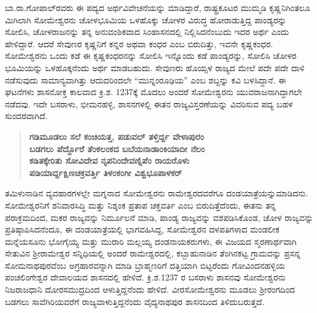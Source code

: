 ಬಾ.ರಾ.ಗೋಪಾಲ್​ರವರು ಈ ಪದ್ಯದ ಅರ್ಥವಿವೇಚನೆಯನ್ನು ಮಾಡಿದ್ದಾರೆ, ರಾಷ್ಟ್ರಕೂಟರ ಮುಮ್ಮಡಿ ಕೃಷ್ಣನಿ\-ಗಿಂತಲೂ ಮಿಗಿಲಾಗಿ ಸೋಮೇಶ್ವರನು ಚೋಳಭೂಮಿಯ ಒಳಹೊಕ್ಕು ಚೋಳರ ವಿರುದ್ಧ ಹೋರಾಡುತ್ತಿದ್ದ ಪಾಂಡ್ಯರನ್ನು ಸೋಲಿಸಿ, ಚೋಳರಾಜನನ್ನು ತನ್ನ ಅನುವಂಶಿಕವಾದ ಸಿಂಹಾಸನದಲ್ಲಿ ನಿಲ್ಲಿಸಿದನೆಂಬುದು ಇದರ ಅರ್ಥ ಎಂದು ಹೇಳಿದ್ದಾರೆ. ಆದರೆ ಸೇವುಣರ ಕೃಷ್ಣನಿಗೆ ಕನ್ನರ ಅಥವಾ ಕಂಧರ ಎಂಬ ಬಿರುದಿತ್ತು, ಇವನೇ ಕೃಷ್ಣಕಂಧರ. ಸೋಮೇಶ್ವರನು ಒಂದು ಕಡೆ ಈ ಕೃಷ್ಣಕಂಧರನನ್ನು ಸೋಲಿಸಿ ಇನ್ನೊಂದು ಕಡೆ ಪಾಂಡ್ಯರನ್ನು, ಸೋಲಿಸಿ ಚೋಳರ ಭೂಮಿಯನ್ನು ಒಳಹೊಕ್ಕನೆಂದು ಅರ್ಥ ಮಾಡಬಹುದು. ಸೇವುಣರು ಹೊಯ್ಸಳ ರಾಜ್ಯದ ಮೇಲೆ ಪದೇ ಪದೇ ದಾಳಿ ನಡೆಸುವುದು ಸಾಮಾನ್ಯವಾಗಿತ್ತು ಆದುದರಿಂದಲೇ “ಮುನ್ನಂರೂಢಿಯ” ಎಂಬ ಶಬ್ದನ್ನು ಕವಿ ಬಳಸಿದ್ದಾನೆ. ಈ ಘಟನೆಗಳು ಶಾಸನೋಕ್ತ ಕಾಲವಾದ ಕ್ರಿ.ಶ. 1237ಕ್ಕೆ ಮೊದಲು ಅಂದರೆ ಸೋಮೇಶ್ವರನು ಯುವರಾಜನಾಗಿದ್ದಾಗಲೇ ನಡೆದವು. ಇದೇ ಬಸರಾಳು, ಭೀಮನಹಳ್ಳಿ, ಶಾಸನಗಳಲ್ಲಿ ಈತನ ರಾಜ್ಯವಿಸ್ತರಣೆಯನ್ನು ವಿವರಿಸುವ ಪದ್ಯ ಬಹಳ ಸುಂದರವಾಗಿದೆ.

\begin{verse}
\textbf{ಗಡಿಮೂಡಲು ಸಲೆ ಕಂಚಿಯತ್ತ, ಪಡುವಲ್​ ತಳ್ತಿರ್ದ್ದ ವೇಳಾಪುರಂ} \\\textbf{ಬಡಗಲು ಪೆರ್ದ್ದೊರೆ ತೆಂಕಲಂಕದ ಬಬೆಯನಾಡಾಂಕಿಯಾದೀ ನೆಲಂ} \\\textbf{ಕಡಿತಕ್ಕೇರಿತು ಸೋವಿದೇವ ನೃಪನಿಂದೇವಣ್ನಿಪೆಂ ರಾಯರೊಳು} \\\textbf{ಪಡಿಯಾರ್ದ್ದಕ್ಷಿಣಚಕ್ರವರ್ತ್ತಿ ತಿಳಂಕಂಗೀ ವಿಶ್ವಭೂಪಾಳಕರ್​}
\end{verse}

ತಮಿಳುನಾಡಿನ ವ್ಯವಹಾರಗಳಲ್ಲೇ ಮಗ್ನನಾದ ಸೋಮೇಶ್ವರನು ರಾಮೇಶ್ವರದವರೆಗೂ ದಂಡಯಾತ್ರೆಯನ್ನು\break ಮಾಡಿದನು. ಸೋಮೇಶ್ವರನಿಗೆ ಶನಿವಾರಸಿದ್ಧಿ ಮತ್ತು ನಿಶ್ಶಂಕ ಪ್ರತಾಪ ಚಕ್ತವರ್ತಿ ಎಂಬ ಬಿರುದಿತ್ತೆದೆಂದು, ಈತನು ತನ್ನ ಪರಾಕ್ರಮದಿಂದ, ಮಕರ ರಾಜ್ಯವನ್ನು ನಿರ್ಮೂಲನೆ ಮಾಡಿ, ಪಾಂಡ್ಯ ರಾಜ್ಯವನ್ನು ವಶಪಡಿಸಿಕೊಂಡ, ಚೋಳ ರಾಜ್ಯವನ್ನು ಪ್ರತಿಷ್ಠಾಪಿಸಿದನೆಂದೂ, ಈ ದಂಡಯಾತ್ರೆಯಲ್ಲಿ ಭಾಗವಹಿಸಿದ್ದ, ಸೋಮೇಶ್ವರನ ದಳಪತಿಗಳಾದ ಮಂಡಲೀಕ ಮನ್ನೆಯಸೂನು ಭೋಗೈಯ್ಯ ಮತ್ತು ಮುರಾರಿ ಮಲ್ಲಯ್ಯ ದಂಡನಾಯಕರುಗಳು, ಈ ವಿಜಯದ ಸ್ಮರಣಾರ್ಥವಾಗಿ ಸೇತುವಿನ ಶ‍್ರೀರಾಮೇಶ್ವರ ಸನ್ನಿಧಿಯಲ್ಲಿ ಅಂದರೆ ರಾಮೇಶ್ವರದಲ್ಲಿ, ಕಬ್ಬಾಹುನಾಡಿನ ತೆಂಗಿನಕಟ್ಟ ಗ್ರಾಮವನ್ನು ಪ್ರಸನ್ನ ಸೋಮನಾಥಪುರವೆಂಬ ಅಗ್ರಹಾರವನ್ನಾಗಿ ಮಾಡಿ ಬ್ರಾಹ್ಮಣರಿಗೆ ದತ್ತಿಯಾಗಿ ಬಿಟ್ಟರೆಂದು ಗೋವಿಂದನಹಳ್ಳಿಯ ಪಂಚಲಿಂಗೇಶ್ವರ ದೇವಾಲಯದ ಶಾಸನದಲ್ಲಿ ಹೇಳಿದೆ. ಕ್ರಿ.ಶ.1237 ರ ಬಸರಾಳು ಶಾಸನವು ಸೋಮೇಶ್ವರನು ನಿಜರಾಜಧಾನಿ ದೋರಸಮುದ್ರ\-ದಿಂದ ಆಳುತ್ತಿದ್ದನೆಂದು ಹೇಳಿದೆ. ವೀರಸೋಮೇಶ್ವರನು ಮೂಡಲು ಶ‍್ರೀರಂಗದಿಂದ ಬಡಗಲು ಸಾವೆಗಿರಿಯವರೆಗೆ ರಾಜ್ಯವಾಳುತ್ತಿದ್ದನೆಂದು ವೈದ್ಯನಾಥಪುರ ಶಾಸನದಿಂದ ತಿಳಿದುಬರುತ್ತದೆ.

